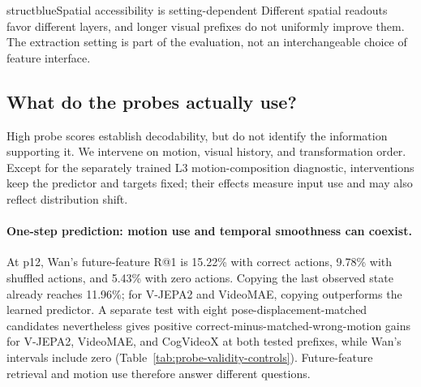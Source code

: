 \documentclass{article} %
\begin{document}

\begin{keyfinding}{structblue}{Spatial accessibility is setting-dependent}
Different spatial readouts favor different layers, and longer visual prefixes do not uniformly improve them.
The extraction setting is part of the evaluation, not an interchangeable
choice of feature interface.
\end{keyfinding}


\subsection{What do the probes actually use?}
\label{sec:probe-validity}
\label{sec:dynamics-controls}
High probe scores establish decodability, but do not identify the information
supporting it. We intervene on motion, visual history, and transformation
order. Except for the separately trained L3 motion-composition diagnostic,
interventions keep the predictor and targets fixed; their effects measure
input use and may also reflect distribution shift.

\paragraph{One-step prediction: motion use and temporal smoothness can coexist.}
At p12, Wan's future-feature R@1 is 15.22\% with correct actions, 9.78\%
with shuffled actions, and 5.43\% with zero actions. Copying the last
observed state already reaches 11.96\%; for V-JEPA2 and VideoMAE, copying
outperforms the learned predictor. A separate test with eight
pose-displacement-matched candidates nevertheless gives positive
correct-minus-matched-wrong-motion gains for V-JEPA2, VideoMAE, and
CogVideoX at both tested prefixes, while Wan's intervals include zero
(Table~\ref{tab:probe-validity-controls}). Future-feature retrieval and
motion use therefore answer different questions.
\end{document}

